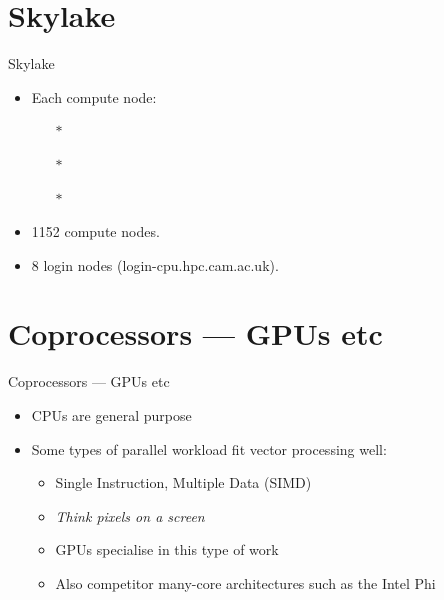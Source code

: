 \section{Skylake}
\begin{frame}{Skylake}
\begin{itemize}
\item{Each compute node:}
\begin{itemize}
\item[$\ast$]{}
\item[$\ast$]{}
\item[$\ast$]{}
\end{itemize}
\item{1152 compute nodes.}
\item{8 login nodes (\alert{login-cpu.hpc.cam.ac.uk}).}
\end{itemize}
\end{frame}

\section{Coprocessors --- GPUs etc}
\begin{frame}{Coprocessors --- GPUs etc}
  \begin{itemize}
  \item{CPUs are \alert{general purpose}}
    \pause
  \item{Some types of parallel workload fit \alert{vector} processing well:}
    \begin{itemize}
    \item{Single Instruction, Multiple Data (SIMD)}
    \item{\emph{Think pixels on a screen}}\pause
    \item{GPUs specialise in this type of work}\pause
      \item{Also competitor many-core architectures such as the Intel Phi}
    \end{itemize}
\end{itemize}
\end{frame}


